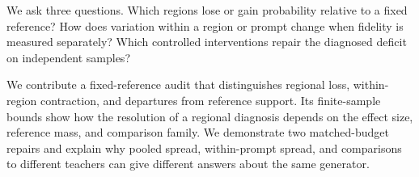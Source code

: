 We ask three questions. Which regions lose or gain probability relative to
a fixed reference? How does variation within a region or prompt change
when fidelity is measured separately? Which controlled interventions
repair the diagnosed deficit on independent samples?

We contribute a fixed-reference audit that distinguishes regional loss,
within-region contraction, and departures from reference support. Its
finite-sample bounds show how the resolution of a regional diagnosis
depends on the effect size, reference mass, and comparison family.
We demonstrate two matched-budget repairs and explain why pooled
spread, within-prompt spread, and comparisons to different teachers
can give different answers about the same generator.
